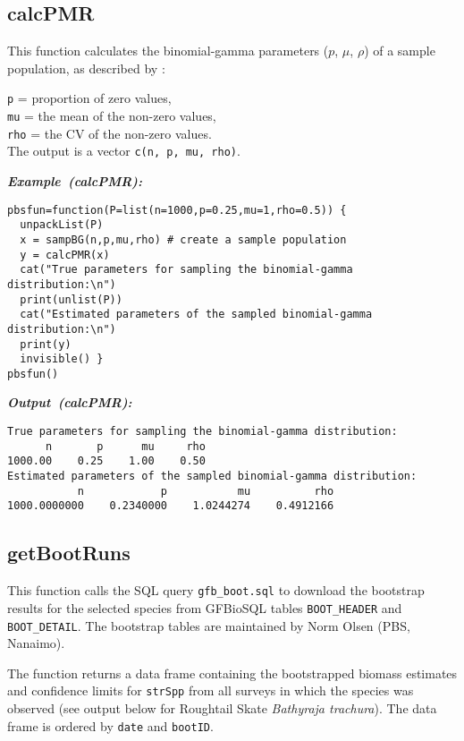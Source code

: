 \documentclass[letterpaper,12pt,fleqn]{article}
\def\tab{\hspace{0.5 in}}
\newcommand{\code}[1]{\small\texttt{#1}\normalsize}
\newcommand{\db}[1]{\small\textmd{\textsf{#1}}\normalsize}
\newcommand\example[1]{    %
	\textbf{\emph{Example~(#1):}}\\ \vspace{3 pt}
}
\newcommand\results[1]{    %
	\textbf{\emph{Output~(#1):}}\\ \vspace{3 pt}
}
\begin{document}
\subsection {calcPMR}

\tab This function calculates the binomial-gamma parameters ($p$, $\mu$, $\rho$) of a sample population, as described by \citet{Schnute-Haigh:2003}: 

\tab \code{p} = proportion of zero values, \\
\tab \code{mu} = the mean of the non-zero values,\\
\tab \code{rho} = the CV of the non-zero values.\\
The output is a vector \code{c(n, p, mu, rho)}.

\begin{examplebox}
\example{calcPMR}
\begin{Verbatim}[fontsize=\footnotesize]
pbsfun=function(P=list(n=1000,p=0.25,mu=1,rho=0.5)) {
  unpackList(P)
  x = sampBG(n,p,mu,rho) # create a sample population
  y = calcPMR(x)
  cat("True parameters for sampling the binomial-gamma distribution:\n")
  print(unlist(P))
  cat("Estimated parameters of the sampled binomial-gamma distribution:\n")
  print(y)
  invisible() }
pbsfun()
\end{Verbatim}
\end{examplebox}

\begin{outputbox}
\results{calcPMR}
\begin{Verbatim}[fontsize=\footnotesize]
True parameters for sampling the binomial-gamma distribution:
      n       p      mu     rho 
1000.00    0.25    1.00    0.50 
Estimated parameters of the sampled binomial-gamma distribution:
           n            p           mu          rho 
1000.0000000    0.2340000    1.0244274    0.4912166
\end{Verbatim}
\end{outputbox}

\subsection {getBootRuns}

\tab This function calls the SQL query \code{gfb\_boot.sql} to download the bootstrap results for the selected species from \db{GFBioSQL} tables \code{BOOT\_HEADER} and \code{BOOT\_DETAIL}. The bootstrap tables are maintained by Norm Olsen (PBS, Nanaimo).

\tab The function returns a data frame containing the bootstrapped biomass estimates and confidence limits for \code{strSpp} from all surveys in which the species was observed (see output below for Roughtail Skate \emph{Bathyraja trachura}). The data frame is ordered by \code{date} and \code{bootID}.
\end{document}
